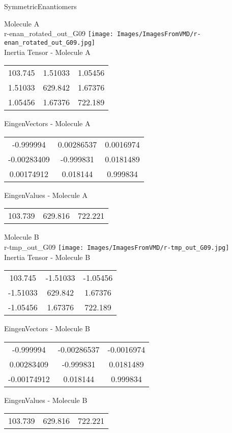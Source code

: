 \vtab[-2cm]
\begin{center}
{\large SymmetricEnantiomers}
\end{center}
\begin{multicols}{2}
\begin{center}
Molecule A \\ 
r-enan\_rotated\_out\_G09
\texttt{[image: Images/ImagesFromVMD/r-enan\_rotated\_out\_G09.jpg]}
\\
Inertia Tensor - Molecule A \\
\vtab
\begin{tabular}{|c c c|}
103.745	 & 	1.51033	 & 	1.05456	 \\
1.51033	 & 	629.842	 & 	1.67376	 \\
1.05456	 & 	1.67376	 & 	722.189
\end{tabular}

\vtab
 EingenVectors - Molecule A     \\
\vtab
\begin{tabular}{|c c c|}
-0.999994	 & 	0.00286537	 & 	0.0016974	 \\
-0.00283409	 & 	-0.999831	 & 	0.0181489	 \\
0.00174912	 & 	0.018144	 & 	0.999834
\end{tabular}

\vtab
 EingenValues - Molecule A     \\
\vtab
\begin{tabular}{|c c c|}
103.739	 & 	629.816	 & 	722.221
\end{tabular}
\columnbreak

Molecule B \\ 
r-tmp\_out\_G09
\texttt{[image: Images/ImagesFromVMD/r-tmp\_out\_G09.jpg]}
\\
Inertia Tensor - Molecule B \\
\vtab
\begin{tabular}{|c c c|}
103.745	 & 	-1.51033	 & 	-1.05456	 \\
-1.51033	 & 	629.842	 & 	1.67376	 \\
-1.05456	 & 	1.67376	 & 	722.189
\end{tabular}

\vtab
 EingenVectors - Molecule B     \\
\vtab
\begin{tabular}{|c c c|}
-0.999994	 & 	-0.00286537	 & 	-0.0016974	 \\
0.00283409	 & 	-0.999831	 & 	0.0181489	 \\
-0.00174912	 & 	0.018144	 & 	0.999834
\end{tabular}

\vtab
 EingenValues - Molecule B     \\
\vtab
\begin{tabular}{|c c c|}
103.739	 & 	629.816	 & 	722.221
\end{tabular}

\end{center}
\end{multicols}
